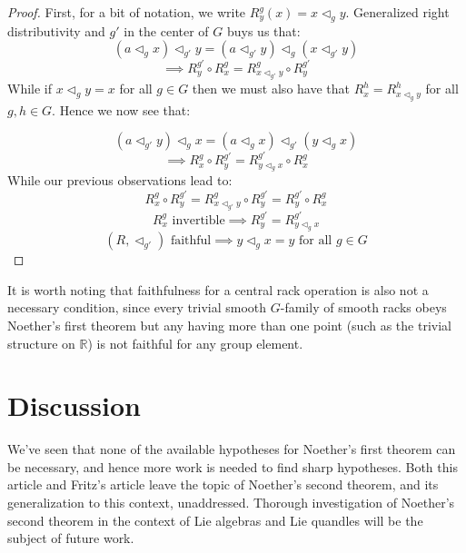 \documentclass[12pt]{amsart}
\theoremstyle{plain}
\theoremstyle{definition}
\begin{document}
\begin{proof}
     First, for a bit of notation, we write $ R^g_y(x) = x \triangleleft_g y $. Generalized right distributivity and $g'$ in the center of $G$ buys us that:
$$ (a \triangleleft_g x)\triangleleft_{g'} y = (a \triangleleft_{g'} y)\triangleleft_{g} (x \triangleleft_{g'} y) $$
$$ \implies  R^{g'}_y \circ R^g_x = R^{g}_{x \triangleleft_{g'} y}  \circ R^{g'}_y $$
While if $ x \triangleleft_{g}y =x$ for all $g \in G$ then we must also have that $ R_{x}^{h} = R_{x \triangleleft_{g}y}^{h} $  for all $g,h \in G  $. Hence we now see that:

$$ (a \triangleleft_{g'} y ) \triangleleft_{g} x = (a \triangleleft_{ g } x) \triangleleft_{g'} (y \triangleleft_{g} x) $$
$$ \implies   R_{x}^{g} \circ R^{g'}_y = R^{g'}_{y \triangleleft_g x} \circ R_{x}^g $$
While our previous observations lead to:
$$ R_{x}^{g} \circ R^{g'}_y  = R_{x\triangleleft_{g'} y}^{g} \circ R^{g'}_y =R^{g'}_y \circ R^g_x  $$
$$ R^g_x \text{ invertible} \implies R^{g'}_y  = R^{g'}_{y \triangleleft_g x} $$ $$  (R,\triangleleft_{g'}) \text{ faithful} \implies y \triangleleft_g x  =y \text{ for all }g \in G$$

\end{proof}
 


\vspace{5mm}


It is worth noting that faithfulness for a central rack operation is also not a necessary condition, since every trivial smooth $G$-family of smooth racks obeys Noether's first theorem but any having more than one point (such as the trivial structure on $\mathbb{R}$) is not faithful for any group element.


\vspace{5mm}

 
\section{Discussion}


We've seen that none of the available hypotheses for Noether's first theorem can be necessary, and hence more work is needed to find sharp hypotheses. Both this article and Fritz's article leave the topic of Noether's second theorem, and its generalization to this context, unaddressed. Thorough investigation of Noether's second theorem in the context of Lie algebras and Lie quandles will be the subject of future work.
\end{document}
